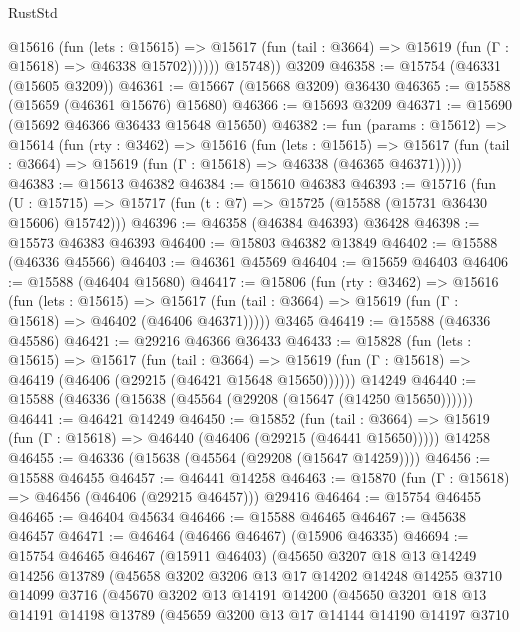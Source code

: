 \begin{lexlean}{RustStd}
\begin{coremodule}
            @15616
              (fun (lets : @15615) =>
              @15617 (fun (tail : @3664) => @15619 (fun (Γ : @15618) => @46338 @15702))))))
        @15748))
    @3209
@46358 := @15754 (@46331 (@15605 @3209))
@46361 := @15667 (@15668 @3209) @36430
@46365 := @15588 (@15659 (@46361 @15676) @15680)
@46366 := @15693 @3209
@46371 := @15690 (@15692 @46366 @36433 @15648 @15650)
@46382 := fun (params : @15612) =>
  @15614
    (fun (rty : @3462) =>
    @15616
      (fun (lets : @15615) =>
      @15617 (fun (tail : @3664) => @15619 (fun (Γ : @15618) => @46338 (@46365 @46371)))))
@46383 := @15613 @46382
@46384 := @15610 @46383
@46393 := @15716
    (fun (U : @15715) => @15717 (fun (t : @7) => @15725 (@15588 (@15731 @36430 @15606) @15742)))
@46396 := @46358 (@46384 @46393) @36428
@46398 := @15573 @46383 @46393
@46400 := @15803 @46382 @13849
@46402 := @15588 (@46336 @45566)
@46403 := @46361 @45569
@46404 := @15659 @46403
@46406 := @15588 (@46404 @15680)
@46417 := @15806
    (fun (rty : @3462) =>
    @15616
      (fun (lets : @15615) =>
      @15617 (fun (tail : @3664) => @15619 (fun (Γ : @15618) => @46402 (@46406 @46371)))))
    @3465
@46419 := @15588 (@46336 @45586)
@46421 := @29216 @46366 @36433
@46433 := @15828
    (fun (lets : @15615) =>
    @15617
      (fun (tail : @3664) =>
      @15619 (fun (Γ : @15618) => @46419 (@46406 (@29215 (@46421 @15648 @15650))))))
    @14249
@46440 := @15588 (@46336 (@15638 (@45564 (@29208 (@15647 (@14250 @15650))))))
@46441 := @46421 @14249
@46450 := @15852
    (fun (tail : @3664) => @15619 (fun (Γ : @15618) => @46440 (@46406 (@29215 (@46441 @15650)))))
    @14258
@46455 := @46336 (@15638 (@45564 (@29208 (@15647 @14259))))
@46456 := @15588 @46455
@46457 := @46441 @14258
@46463 := @15870 (fun (Γ : @15618) => @46456 (@46406 (@29215 @46457))) @29416
@46464 := @15754 @46455
@46465 := @46404 @45634
@46466 := @15588 @46465
@46467 := @45638 @46457
@46471 := @46464 (@46466 @46467) (@15906 @46335)
@46694 := @15754
    @46465
    @46467
    (@15911 @46403)
    (@45650
      @3207
      @18
      @13
      @14249
      @14256
      @13789
      (@45658
        @3202
        @3206
        @13
        @17
        @14202
        @14248
        @14255
        @3710
        @14099
        @3716
        (@45670
          @3202
          @13
          @14191
          @14200
          (@45650
            @3201
            @18
            @13
            @14191
            @14198
            @13789
            (@45659
              @3200
              @13
              @17
              @14144
              @14190
              @14197
              @3710

\end{coremodule}
\end{lexlean}
